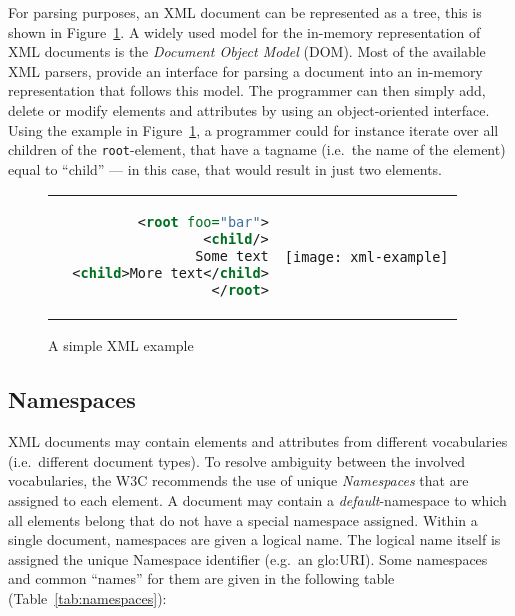 For parsing purposes,  an XML document can be represented  as a tree, this
is  shown in Figure~\ref{fig:xml-example}.   A widely  used model  for the
in-memory  representation of  XML documents  is the  \emph{Document Object
  Model} (DOM).  Most  of the available XML parsers,  provide an interface
for parsing a document into  an in-memory representation that follows this
model. The programmer  can then simply add, delete  or modify elements and
attributes by  using an object-oriented  interface.  Using the  example in
Figure~\ref{fig:xml-example}, a programmer could for instance iterate over
all children  of the \texttt{root}-element, that have  a tagname (i.e.~the
name  of the  element) equal  to ``child''  --- in  this case,  that would
result in just two elements.

\begin{figure}[h]
  \centering
  \begin{tabular}{rc}
    \begin{minipage}[c]{.35\textwidth}
      \begin{lstlisting}[language=XML]
<root foo="bar">
  <child/>
  Some text
  <child>More text</child>
</root>
      \end{lstlisting}%
    \end{minipage} &
    \begin{minipage}[c]{.35\textwidth}
      \texttt{[image: xml-example]}
    \end{minipage}
  \end{tabular}
  \caption{A simple XML example}
  \label{fig:xml-example}
\end{figure}

\subsection{Namespaces}

XML  documents   may  contain  elements  and   attributes  from  different
vocabularies (i.e.~different document types). To resolve ambiguity between
the  involved   vocabularies,  the  W3C  recommends  the   use  of  unique
\emph{Namespaces}  that are  assigned  to each  element.   A document  may
contain a  \emph{default}-namespace to which  all elements belong  that do
not  have  a  special  namespace  assigned.   Within  a  single  document,
namespaces are given  a logical name. The logical  name itself is assigned
the unique  Namespace identifier (e.g.~an  \gls{glo:URI}). Some namespaces
and  common  ``names''   for  them  are  given  in   the  following  table
(Table~\ref{tab:namespaces}):

